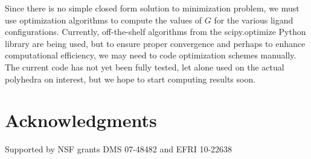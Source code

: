 \documentclass[12pt]{article}
\begin{document}
Since there is no simple closed form solution to minimization problem, we must use optimization algorithms to compute the values of $G$ for the various ligand configurations. Currently, off-the-shelf algorithms from the scipy.optimize Python library are being used, but to ensure proper convergence and perhaps to enhance computational efficiency, we may need to code optimization schemes manually. The current code has not yet been fully tested, let alone used on the actual polyhedra on interest, but we hope to start computing results soon.  



\section*{Acknowledgments}\label{ackowledgements}
        Supported by NSF grants DMS 07-48482 and EFRI 10-22638



\end{document}
